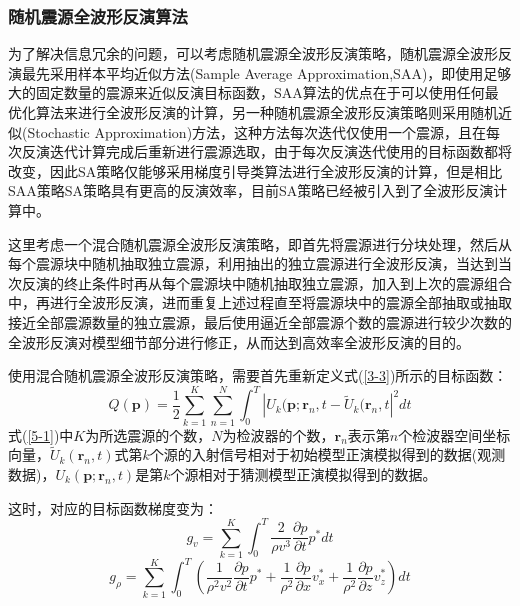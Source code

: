 \documentclass[12pt]{article}
\newcommand{\upcite}[1]{\textsuperscript{\textsuperscript{\cite{#1}}}}
\begin{document}
\subsubsection{随机震源全波形反演算法}
为了解决信息冗余的问题，可以考虑随机震源全波形反演策略，随机震源全波形反演最先采用样本平均近似方法(Sample Average Approximation,SAA)\upcite{Shapiro2005}，即使用足够大的固定数量的震源来近似反演目标函数，SAA算法的优点在于可以使用任何最优化算法来进行全波形反演的计算，另一种随机震源全波形反演策略则采用随机近似(Stochastic Approximation)方法，这种方法每次迭代仅使用一个震源，且在每次反演迭代计算完成后重新进行震源选取，由于每次反演迭代使用的目标函数都将改变，因此SA策略仅能够采用梯度引导类算法进行全波形反演的计算\upcite{Nemirovski2009}，但是相比SAA策略SA策略具有更高的反演效率，目前SA策略已经被引入到了全波形反演计算中\upcite{Krebs2009,Moghaddam2010}。
\par
这里考虑一个混合随机震源全波形反演策略\upcite{van2011,Aravkin2012,van2013}，即首先将震源进行分块处理，然后从每个震源块中随机抽取独立震源，利用抽出的独立震源进行全波形反演，当达到当次反演的终止条件时再从每个震源块中随机抽取独立震源，加入到上次的震源组合中，再进行全波形反演，进而重复上述过程直至将震源块中的震源全部抽取或抽取接近全部震源数量的独立震源，最后使用逼近全部震源个数的震源进行较少次数的全波形反演对模型细节部分进行修正，从而达到高效率全波形反演的目的。
\par
使用混合随机震源全波形反演策略，需要首先重新定义式(\ref{3-3})所示的目标函数：
\begin{equation}\label{5-1}
Q(\boldsymbol{p})=\frac{1}{2}\sum_{k=1}^K\sum_{n=1}^N\int_0^T |U_k(\boldsymbol{p};\boldsymbol{r}_n,t-\tilde{U}_k(\boldsymbol{r}_n,t|^2 dt
\end{equation}
式(\ref{5-1})中$K$为所选震源的个数，$N$为检波器的个数，$\boldsymbol{r}_n$表示第$n$个检波器空间坐标向量，$\tilde{U}_k(\boldsymbol{r}_n,t)$式第$k$个源的入射信号相对于初始模型正演模拟得到的数据(观测数据)，$U_k(\boldsymbol{p};\boldsymbol{r}_n,t)$是第$k$个源相对于猜测模型正演模拟得到的数据。
\par
这时，对应的目标函数梯度变为：
\begin{equation}\label{5-2}
g_{v}=\sum_{k=1}^K \int_0^T \frac{2}{\rho v^3}\frac{\partial p}{\partial t}p^*dt
\end{equation}
\begin{equation}\label{5-3}
g_{\rho}=\sum_{k=1}^K \int_0^T (\frac{1}{\rho^2 v^2}\frac{\partial p}{\partial t}p^*+\frac{1}{\rho^2}\frac{\partial p}{\partial x}v_x^*+\frac{1}{\rho^2}\frac{\partial p}{\partial z}v_z^*)dt
\end{equation}
\end{document}
